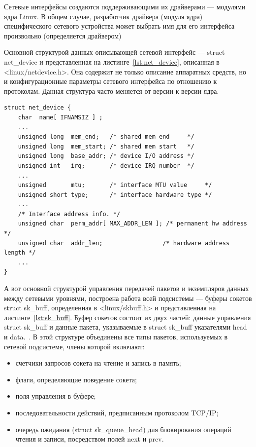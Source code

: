 Сетевые интерфейсы создаются поддерживающими их драйверами — модулями ядра Linux. В общем случае, разработчик драйвера (модуля ядра) специфического сетевого устройства может выбрать имя для его интерфейса произвольно (определяется драйвером)

Основной структурой данных описывающей сетевой интерфейс --- struct net\_device и представленная на листинге~\ref{lst:net_device}, описанная в <linux/netdevice.h>. Она содержит не только описание аппаратных средств, но и конфигурационные параметры сетевого интерфейса по отношению к протоколам. Данная структура часто меняется от версии к версии ядра.

\clearpage

\begin{lstlisting}[label=lst:net_device,caption=Основная структура данных]
struct net_device { 
	char  name[ IFNAMSIZ ] ; 
	...
	unsigned long  mem_end;   /* shared mem end     */ 
	unsigned long  mem_start; /* shared mem start   */ 
	unsigned long  base_addr; /* device I/O address */ 
	unsigned int   irq;       /* device IRQ number  */ 
	...
	unsigned       mtu;       /* interface MTU value     */ 
	unsigned short type;      /* interface hardware type */ 
	...
	/* Interface address info. */ 
	unsigned char  perm_addr[ MAX_ADDR_LEN ]; /* permanent hw address    */ 
	unsigned char  addr_len;                 /* hardware address length */ 
	...
}
\end{lstlisting}

А вот основной структурой управления передачей пакетов и экземпляров данных между сетевыми уровнями, построена работа всей подсистемы --- буферы сокетов struct sk\_buff, определенная в <linux/skbuff.h> и представленная на листинге~\ref{lst:sk_buff}.
Буфер сокетов состоит их двух частей: данные управления struct sk\_buff и данные пакета, указываемые в struct sk\_buff указателями head и data.~\cite{moduls_kernel_linux, os_gostev}.
В этой структуре объединены все типы пакетов, используемых в сетевой подсистеме, члены которой включают:
\begin{itemize}
	\item счетчики запросов сокета на чтение и запись в память;
	\item флаги, определяющие поведение сокета;
	\item поля управления в буфере;
	\item последовательности действий, предписанным протоколом TCP/IP;
	\item очередь ожидания (struct sk\_queue\_head) для блокирования операций чтения и записи, посредством полей next и prev.
\end{itemize}

